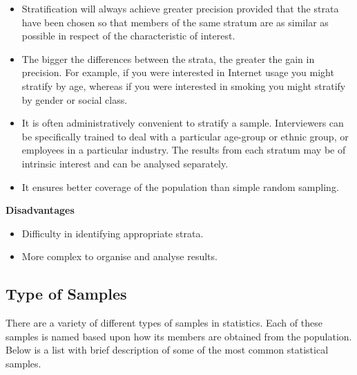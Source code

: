 ﻿\documentclass[]{report}
\begin{document}
\begin{itemize}
\item Stratification will always achieve greater precision provided that the strata have been chosen so
that members of the same stratum are as similar as possible in respect of the characteristic of
interest. 

\item The bigger the differences between the strata, the greater the gain in precision. For
example, if you were interested in Internet usage you might stratify by age, whereas if you were
interested in smoking you might stratify by gender or social class.

\item It is often administratively convenient to stratify a sample. Interviewers can be specifically trained
to deal with a particular age-group or ethnic group, or employees in a particular industry. The
results from each stratum may be of intrinsic interest and can be analysed separately.

\item It ensures better coverage of the population than simple random sampling.

\end{itemize}
\textbf{Disadvantages}\\
\begin{itemize}
\item Difficulty in identifying appropriate strata.
\item More complex to organise and analyse results.
\end{itemize}




\subsection{Type of Samples}
There are a variety of different types of samples in statistics. Each of these samples is named based upon how its members are obtained from the population. Below is a list with brief description of some of the most common statistical samples.
\end{document}
